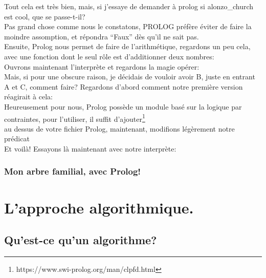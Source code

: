 \documentclass[a4paper, 12pt]{article}
\numberwithin{equation}{subsection}
\begin{document}
Tout cela est très bien, mais, si j'essaye de demander à prolog si alonzo\_church est cool, que se passe-t-il? \\[0.2cm]
Pas grand chose comme nous le constatons, PROLOG préfère éviter de faire la moindre assomption, et répondra ``Faux'' dès qu'il ne sait pas. \\

Ensuite, Prolog nous permet de faire de l'arithmétique, regardons un peu cela, avec une fonction dont le seul rôle est d'additionner deux nombres: \\[0.2cm]
Ouvrons maintenant l'interprète et regardons la magie opérer: \\[0.2cm]

Mais, si pour une obscure raison, je décidais de vouloir avoir B, juste en entrant A et C, comment faire? Regardons d'abord comment notre première version réagirait à cela: \\[0.2cm]

Heureusement pour nous, Prolog possède un module basé sur la logique par contraintes, pour l'utiliser, il suffit d'ajouter\footnote{https://www.swi-prolog.org/man/clpfd.html} \\[0.2cm]

au dessus de votre fichier Prolog, maintenant, modifions légèrement notre prédicat \\[0.2cm]
Et voilà! Essayons là maintenant avec notre interprète: \\[0.2cm]

\subsubsection{Mon arbre familial, avec Prolog!}

\newpage
\section{L'approche algorithmique.}
\subsection{Qu'est-ce qu'un algorithme?}
\begin{center}
\end{center}
\end{document}
